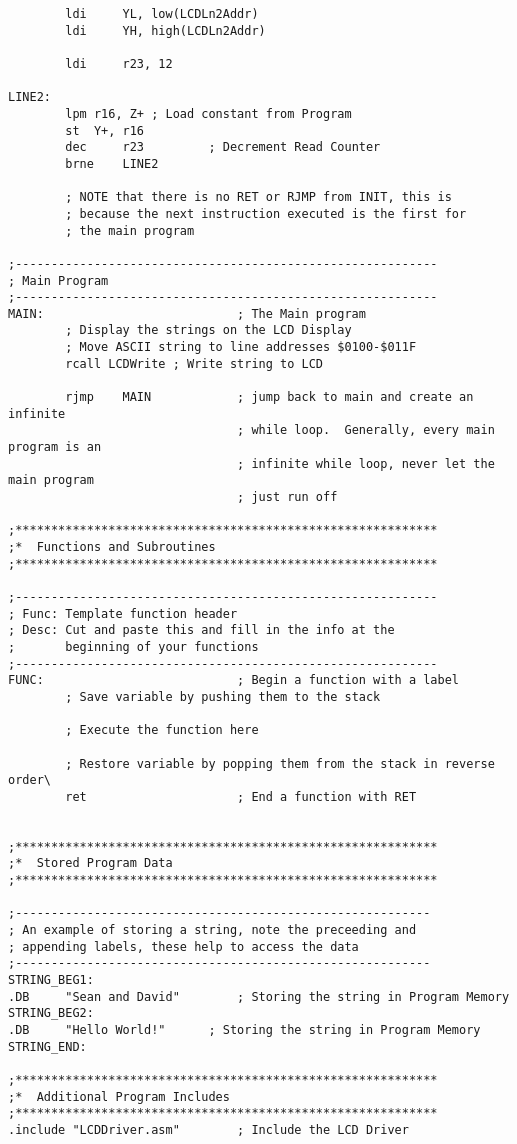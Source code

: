 \documentclass[12pt,letterpaper]{article}
\begin{document}
\begin{verbatim}
		ldi		YL, low(LCDLn2Addr)
		ldi		YH, high(LCDLn2Addr)

		ldi		r23, 12

LINE2:
		lpm r16, Z+ ; Load constant from Program
		st  Y+, r16
		dec		r23			; Decrement Read Counter
		brne	LINE2

		; NOTE that there is no RET or RJMP from INIT, this is
		; because the next instruction executed is the first for
		; the main program

;-----------------------------------------------------------
; Main Program
;-----------------------------------------------------------
MAIN:							; The Main program
		; Display the strings on the LCD Display
		; Move ASCII string to line addresses $0100-$011F
		rcall LCDWrite ; Write string to LCD
		
		rjmp	MAIN			; jump back to main and create an infinite
								; while loop.  Generally, every main program is an
								; infinite while loop, never let the main program
								; just run off

;***********************************************************
;*	Functions and Subroutines
;***********************************************************

;-----------------------------------------------------------
; Func: Template function header
; Desc: Cut and paste this and fill in the info at the 
;		beginning of your functions
;-----------------------------------------------------------
FUNC:							; Begin a function with a label
		; Save variable by pushing them to the stack

		; Execute the function here
		
		; Restore variable by popping them from the stack in reverse order\
		ret						; End a function with RET


;***********************************************************
;*	Stored Program Data
;***********************************************************

;----------------------------------------------------------
; An example of storing a string, note the preceeding and
; appending labels, these help to access the data
;----------------------------------------------------------
STRING_BEG1:
.DB		"Sean and David"		; Storing the string in Program Memory
STRING_BEG2:
.DB		"Hello World!"		; Storing the string in Program Memory
STRING_END:

;***********************************************************
;*	Additional Program Includes
;***********************************************************
.include "LCDDriver.asm"		; Include the LCD Driver
\end{verbatim}
\end{document}
